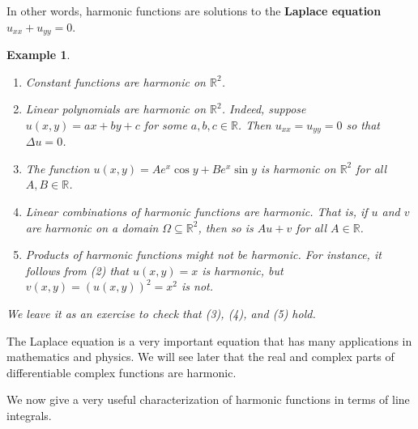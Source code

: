 \documentclass[10pt]{article}
\newcommand{\R}{\mathbb{R}}
\theoremstyle{newstyle}
\newtheorem{exmp}[thm]{Example}
\begin{document}
In other words, harmonic functions are solutions to the {\bf Laplace equation} $u_{xx} + u_{yy} = 0$.

\begin{exmp}~
\begin{enumerate}[(1)]
    \item Constant functions are harmonic on $\R^2$.
    \item Linear polynomials are harmonic on $\R^2$. Indeed, suppose $u(x, y) = ax+by+c$ for some 
    $a, b, c \in \R$. Then $u_{xx} = u_{yy} = 0$ so that $\Delta u = 0$. 
    \item The function $u(x, y) = Ae^x \cos y + Be^x \sin y$ is harmonic on $\R^2$ for all 
    $A, B \in \R$. 
    \item Linear combinations of harmonic functions are harmonic. That is, 
    if $u$ and $v$ are harmonic on a domain $\Omega \subseteq \R^2$, then so is 
    $Au+v$ for all $A \in \R$. 
    \item Products of harmonic functions might not be harmonic. For instance, 
    it follows from (2) that $u(x, y) = x$ is harmonic, but 
    $v(x, y) = (u(x, y))^2 = x^2$ is not.
\end{enumerate}
We leave it as an exercise to check that (3), (4), and (5) hold. 
\end{exmp}

The Laplace equation is a very important equation that has many applications in mathematics and 
physics. We will see later that the real and complex parts of differentiable complex functions 
are harmonic. 

We now give a very useful characterization of harmonic functions in terms of line integrals.
\end{document}
